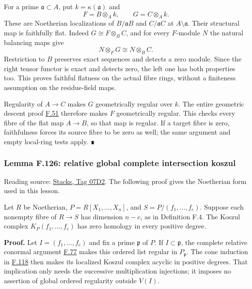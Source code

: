 \documentclass[11pt,a4paper,openany]{report}
\newcounter{none}
\begin{document}
For a prime \(\mathfrak a\subset A\), put \(k=\kappa(\mathfrak a)\) and \[F=B\otimes_Ak,\qquad G=C\otimes_Ak.\] These are Noetherian localizations of \(B/\mathfrak aB\) and \(C/\mathfrak aC\) at \(A\setminus\mathfrak a\). Their structural map is faithfully flat. Indeed \(G\cong F\otimes_BC\), and for every \(F\)-module \(N\) the natural balancing maps give \[N\otimes_FG\cong N\otimes_BC.\] Restriction to \(B\) preserves exact sequences and detects a zero module. Since the right tensor functor is exact and detects zero, the left one has both properties too. This proves faithful flatness on the actual fibre rings, without a finiteness assumption on the residue-field maps.

Regularity of \(A\to C\) makes \(G\) geometrically regular over \(k\). The entire geometric descent proof \hyperref[AG-RG-S05-algebra-lemma-geometrically-regular-descent]{F.51} therefore makes \(F\) geometrically regular. This checks every fibre of the flat map \(A\to B\), so that map is regular. If a target fibre is zero, faithfulness forces its source fibre to be zero as well; the same argument and empty local-ring tests apply. ∎

\label{AG-RG-S05-more-algebra-lemma-relative-global-complete-intersection-koszul}

\subsubsection{Lemma F.126: relative global complete intersection koszul}\label{AG-RG-S05-lemma-f.126-relative-global-complete-intersection-koszul}

Reading source: \href{https://stacks.math.columbia.edu/tag/07D2}{Stacks, Tag 07D2}. The following proof gives the Noetherian form used in this lesson.

Let \(R\) be Noetherian, \(P=R[X_1,\ldots,X_n]\), and \(S=P/(f_1,\ldots,f_c)\). Suppose each nonempty fibre of \(R\to S\) has dimension \(n-c\), as in Definition F.4. The Koszul complex \(K_P(f_1,\ldots,f_c)\) has zero homology in every positive degree.

\textbf{Proof.} Let \(I=(f_1,\ldots,f_c)\) and fix a prime \(\mathfrak p\) of \(P\). If \(I\subset\mathfrak p\), the complete relative conormal argument \hyperref[AG-RG-S05-algebra-lemma-relative-global-complete-intersection-conormal]{F.77} makes this ordered list regular in \(P_{\mathfrak p}\). The cone induction in \hyperref[AG-RG-S05-more-algebra-lemma-noetherian-finite-all-equivalent]{F.118} then makes its localized Koszul complex acyclic in positive degrees. That implication only needs the successive multiplication injections; it imposes no assertion of global ordered regularity outside \(V(I)\).
\end{document}
